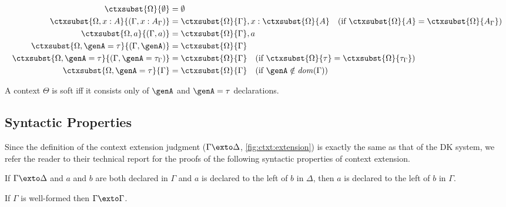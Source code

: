 \begin{definition}
  \begin{align*}
    \ctxsubst{\Omega}{\emptyset} &= \emptyset \\
    \ctxsubst{\Omega, x : A}{(\Gamma, x : A_{\Gamma})} &= \ctxsubst{\Omega}{\Gamma}, x : \ctxsubst{\Omega}{A} \quad (\text{if $\ctxsubst{\Omega}{A} = \ctxsubst{\Omega}{A_\Gamma}$}) \\
    \ctxsubst{\Omega, a}{(\Gamma, a)} &= \ctxsubst{\Omega}{\Gamma}, a \\
    \ctxsubst{\Omega, \genA = \tau}{(\Gamma, \genA)} &= \ctxsubst{\Omega}{\Gamma} \\
    \ctxsubst{\Omega, \genA = \tau}{(\Gamma, \genA = \tau_\Gamma)} &= \ctxsubst{\Omega}{\Gamma} \quad (\text{if $\ctxsubst{\Omega}{\tau} = \ctxsubst{\Omega}{\tau_\Gamma}$}) \\
    \ctxsubst{\Omega, \genA = \tau}{\Gamma} &= \ctxsubst{\Omega}{\Gamma} \quad (\text{if $\genA \notin \mathit{dom}(\Gamma)$})
  \end{align*}
\end{definition}

\begin{definition}[Softness]
  A context $\Theta$ is soft iff it consists only of $\genA$ and $\genA = \tau$ declarations.
\end{definition}


\subsection{Syntactic Properties}

Since the definition of the context extension judgment ($\Gamma \exto \Delta$,
\cref{fig:ctxt:extension}) is exactly the same as that of the DK system, we refer
the reader to their technical report for the proofs of the following syntactic
properties of context extension.


\begin{mlemma}
  If $\Gamma \exto \Delta$ and $a$ and $b$ are both declared in $\Gamma$ and $a$
  is declared to the left of $b$ in $\Delta$, then $a$ is declared to the left
  of $b$ in $\Gamma$.
  \label{lemma:reverse_preserve}
\end{mlemma}



\begin{mlemma}[Reflexivity]
  If $\Gamma$ is well-formed then $\Gamma \exto \Gamma$.
  \label{lemma:reflexivity}
\end{mlemma}


